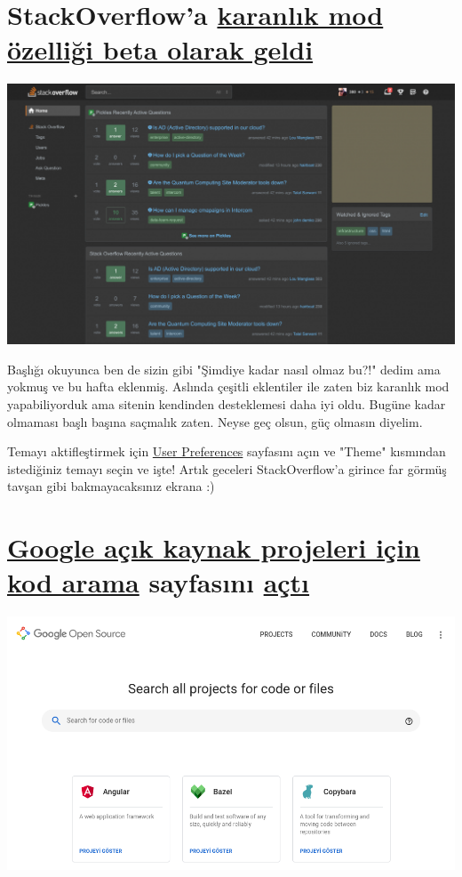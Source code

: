 \documentclass[11pt]{article}
\begin{document}
\section{StackOverflow'a \href{https://stackoverflow.blog/2020/03/30/introducing-dark-mode-for-stack-overflow/}{karanlık mod özelliği beta olarak geldi}}
\label{sec:org8d43dcd}
\begin{center}
\includegraphics[width=.9\linewidth]{gorseller/stackoverflow-dark-mode.png}
\end{center}

Başlığı okuyunca ben de sizin gibi "Şimdiye kadar nasıl olmaz bu?!" dedim ama
yokmuş ve bu hafta eklenmiş. Aslında çeşitli eklentiler ile zaten biz karanlık
mod yapabiliyorduk ama sitenin kendinden desteklemesi daha iyi oldu. Bugüne
kadar olmaması başlı başına saçmalık zaten. Neyse geç olsun, güç olmasın
diyelim.

Temayı aktifleştirmek için \href{https://stackoverflow.com/users/preferences/current}{User Preferences} sayfasını açın ve "Theme"
kısmından istediğiniz temayı seçin ve işte! Artık geceleri StackOverflow'a
girince far görmüş tavşan gibi bakmayacaksınız ekrana :)
\section{\href{https://cs.opensource.google/}{Google açık kaynak projeleri için kod arama} sayfasını \href{https://opensource.googleblog.com/2020/04/code-search-for-google-open-source.html?m=1}{açtı}}
\label{sec:org936100f}
\begin{center}
\includegraphics[width=.9\linewidth]{gorseller/google-code-search.png}
\end{center}
\end{document}
